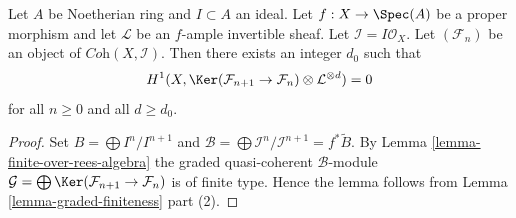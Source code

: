 \begin{lemma}
\label{lemma-vanishing-projective}
Let $A$ be Noetherian ring and $I \subset A$ an ideal.
Let $f : X \to \Spec(A)$ be a proper morphism and let
$\mathcal{L}$ be an $f$-ample invertible sheaf. Let
$\mathcal{I} = I\mathcal{O}_X$. Let $(\mathcal{F}_n)$ be an
object of $\textit{Coh}(X, \mathcal{I})$. Then there exists an
integer $d_0$ such that
$$
H^1(X, \Ker(\mathcal{F}_{n + 1} \to \mathcal{F}_n)
\otimes \mathcal{L}^{\otimes d} )
= 0
$$
for all $n \geq 0$ and all $d \geq d_0$.
\end{lemma}

\begin{proof}
Set $B = \bigoplus I^n/I^{n + 1}$ and
$\mathcal{B} = \bigoplus \mathcal{I}^n/\mathcal{I}^{n + 1} = f^*\widetilde{B}$.
By Lemma \ref{lemma-finite-over-rees-algebra} the graded quasi-coherent
$\mathcal{B}$-module
$\mathcal{G} = \bigoplus \Ker(\mathcal{F}_{n + 1} \to \mathcal{F}_n)$
is of finite type. Hence the lemma follows from
Lemma \ref{lemma-graded-finiteness} part (2).
\end{proof}
